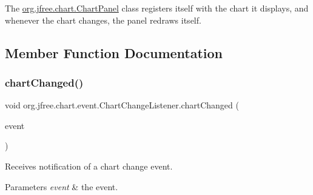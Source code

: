 The \mbox{\hyperlink{classorg_1_1jfree_1_1chart_1_1_chart_panel}{org.\+jfree.\+chart.\+Chart\+Panel}} class registers itself with the chart it displays, and whenever the chart changes, the panel redraws itself. 

\subsection{Member Function Documentation}
\mbox{\label{interfaceorg_1_1jfree_1_1chart_1_1event_1_1_chart_change_listener_ac4ad92c4f9cc7be26964dab79d882bee}} 
\subsubsection{\texorpdfstring{chart\+Changed()}{chartChanged()}}
{\footnotesize\ttfamily void org.\+jfree.\+chart.\+event.\+Chart\+Change\+Listener.\+chart\+Changed (\begin{DoxyParamCaption}\item[{\mbox{\hyperlink{classorg_1_1jfree_1_1chart_1_1event_1_1_chart_change_event}{Chart\+Change\+Event}}}]{event }\end{DoxyParamCaption})}

Receives notification of a chart change event.


\begin{DoxyParams}{Parameters}
{\em event} & the event. \\
\hline
\end{DoxyParams}


